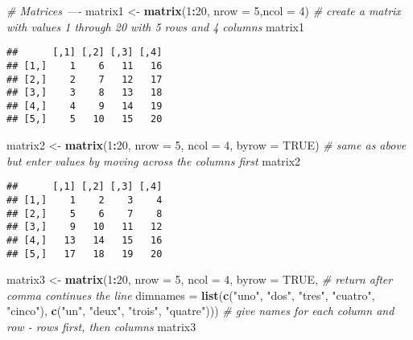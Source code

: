 \documentclass[
]{article}
\newenvironment{Shaded}{\begin{snugshade}}{\end{snugshade}}
\newcommand{\CommentTok}[1]{\textcolor[rgb]{0.56,0.35,0.01}{\textit{#1}}}
\newcommand{\DataTypeTok}[1]{\textcolor[rgb]{0.13,0.29,0.53}{#1}}
\newcommand{\DecValTok}[1]{\textcolor[rgb]{0.00,0.00,0.81}{#1}}
\newcommand{\KeywordTok}[1]{\textcolor[rgb]{0.13,0.29,0.53}{\textbf{#1}}}
\newcommand{\NormalTok}[1]{#1}
\newcommand{\OperatorTok}[1]{\textcolor[rgb]{0.81,0.36,0.00}{\textbf{#1}}}
\newcommand{\OtherTok}[1]{\textcolor[rgb]{0.56,0.35,0.01}{#1}}
\newcommand{\StringTok}[1]{\textcolor[rgb]{0.31,0.60,0.02}{#1}}
\begin{document}
\begin{Shaded}
\begin{Highlighting}[]
\CommentTok{# Matrices ----}
\NormalTok{matrix1 <-}\StringTok{ }\KeywordTok{matrix}\NormalTok{(}\DecValTok{1}\OperatorTok{:}\DecValTok{20}\NormalTok{, }\DataTypeTok{nrow =} \DecValTok{5}\NormalTok{,}\DataTypeTok{ncol =} \DecValTok{4}\NormalTok{) }\CommentTok{# create a matrix with values 1 through 20 with 5 rows and 4 columns}
\NormalTok{matrix1}
\end{Highlighting}
\end{Shaded}

\begin{verbatim}
##      [,1] [,2] [,3] [,4]
## [1,]    1    6   11   16
## [2,]    2    7   12   17
## [3,]    3    8   13   18
## [4,]    4    9   14   19
## [5,]    5   10   15   20
\end{verbatim}

\begin{Shaded}
\begin{Highlighting}[]
\NormalTok{matrix2 <-}\StringTok{ }\KeywordTok{matrix}\NormalTok{(}\DecValTok{1}\OperatorTok{:}\DecValTok{20}\NormalTok{, }\DataTypeTok{nrow =} \DecValTok{5}\NormalTok{, }\DataTypeTok{ncol =} \DecValTok{4}\NormalTok{, }\DataTypeTok{byrow =} \OtherTok{TRUE}\NormalTok{) }\CommentTok{# same as above but enter values by moving across the columns first}
\NormalTok{matrix2}
\end{Highlighting}
\end{Shaded}

\begin{verbatim}
##      [,1] [,2] [,3] [,4]
## [1,]    1    2    3    4
## [2,]    5    6    7    8
## [3,]    9   10   11   12
## [4,]   13   14   15   16
## [5,]   17   18   19   20
\end{verbatim}

\begin{Shaded}
\begin{Highlighting}[]
\NormalTok{matrix3 <-}\StringTok{ }\KeywordTok{matrix}\NormalTok{(}\DecValTok{1}\OperatorTok{:}\DecValTok{20}\NormalTok{, }\DataTypeTok{nrow =} \DecValTok{5}\NormalTok{, }\DataTypeTok{ncol =} \DecValTok{4}\NormalTok{, }\DataTypeTok{byrow =} \OtherTok{TRUE}\NormalTok{, }\CommentTok{# return after comma continues the line}
                  \DataTypeTok{dimnames =} \KeywordTok{list}\NormalTok{(}\KeywordTok{c}\NormalTok{(}\StringTok{"uno"}\NormalTok{, }\StringTok{"dos"}\NormalTok{, }\StringTok{"tres"}\NormalTok{, }\StringTok{"cuatro"}\NormalTok{, }\StringTok{"cinco"}\NormalTok{), }
                                  \KeywordTok{c}\NormalTok{(}\StringTok{"un"}\NormalTok{, }\StringTok{"deux"}\NormalTok{, }\StringTok{"trois"}\NormalTok{, }\StringTok{"quatre"}\NormalTok{))) }\CommentTok{# give names for each column and row - rows first, then columns }
\NormalTok{matrix3}
\end{Highlighting}
\end{Shaded}
\end{document}
